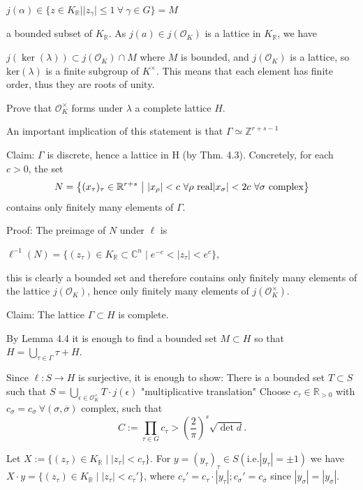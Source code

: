 \(j(\alpha) \in \{ z \in K_\mathbb{R} \mid \vert z_\gamma \vert \le 1 \ \forall \ \gamma \in G \} = M\)

a bounded subset of \(K_\mathbb{R}\). As \(j(a) \in j(\mathcal{O}_K)\) is a lattice in \(K_\mathbb{R}\), we have

\(j(\ker(\lambda)) \subset j(\mathcal{O}_K) \cap M\)
where \( M \) is bounded, and \(j(\mathcal{O}_K)\) is a lattice,
so \(\text{ker}(\lambda)\) is a finite subgroup of \(K^\times\). 
This means that each element has finite order, thus they are roots of unity. 


Prove that \( \mathcal{O}_K^{\times} \) forms under \( \lambda \) a complete lattice \( H \).

An important implication of this statement is that \( \Gamma \simeq \mathbb{Z}^{r+s-1} \)

Claim: \(\Gamma\) is discrete, hence a lattice in H (by Thm. 4.3).
Concretely, for each \(c > 0\), the set
\[
N = \left\{ (x_\tau)_\tau \in \mathbb{R}^{r+s} \ \middle| \ 
|x_\rho| < c \ \forall \rho \ \text{real} \\ 
|x_\sigma| < 2c \ \forall \sigma \ \text{complex} \right\}
\]
contains only finitely many elements of \(\Gamma\).

Proof: The preimage of \(N\) under \(\ell\) is

\(\ell^{-1}(N) = \{ (z_\tau) \in K_\mathbb{R} \subset \mathbb{C}^n \mid e^{-c} < |z_\tau| < e^c \}\),

this is clearly a bounded set and therefore contains only finitely many elements of the lattice \(j(\mathcal{O}_K)\), hence only finitely many elements of \(j(\mathcal{O}_K^{\times})\).

Claim: The lattice \(\Gamma \subset H\) is complete.

By Lemma 4.4 it is enough to find a bounded set \(M \subset H\) so that \(H = \bigcup_{\tau \in \Gamma} \tau + H\).

Since \(\ell : S \to H\) is surjective, it is enough to show: There is a bounded set \(T \subset S\)
such that 
\(S = \bigcup_{\epsilon \in \mathcal{O}_K^{\times}} T \cdot j(\epsilon)\) "multiplicative translation"
Choose \(c_\tau \in \mathbb{R}_{>0}\) with \(c_\sigma = c_{\overline{\sigma}} \ \forall (\sigma, \overline{\sigma})\) complex, such that 
\[C := \prod_{\tau \in G} c_\tau > \left( \frac{2}{\pi} \right)^s \sqrt{\det d}.\]

Let \(X := \{ (z_\tau) \in K_\mathbb{R} \mid |z_\tau| < c_\tau \}\). For \(y = (y_\tau)_\tau \in S (\text{i.e.} |y_\tau| = \pm 1)\) we have
\(X \cdot y = \{ (z_\tau) \in K_\mathbb{R} \mid |z_\tau| < c_\tau' \}\), where \(c_\tau' = c_\tau \cdot |y_\tau|; c_\sigma' = c_{\overline{\sigma}}\) 
since \(|y_\sigma| = |y_{\overline{\sigma}}|\).

